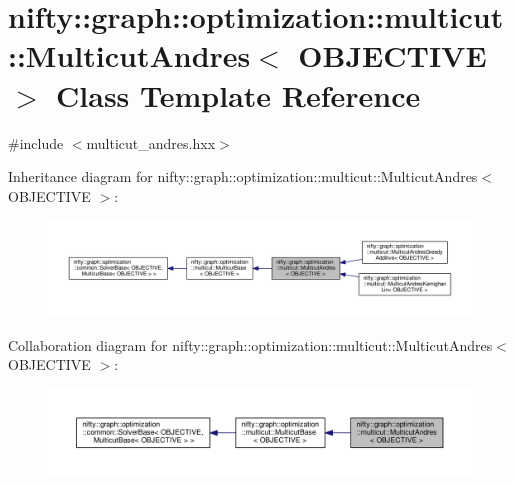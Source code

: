 \hypertarget{classnifty_1_1graph_1_1optimization_1_1multicut_1_1MulticutAndres}{}\section{nifty\+:\+:graph\+:\+:optimization\+:\+:multicut\+:\+:Multicut\+Andres$<$ O\+B\+J\+E\+C\+T\+I\+V\+E $>$ Class Template Reference}
\label{classnifty_1_1graph_1_1optimization_1_1multicut_1_1MulticutAndres}


{\ttfamily \#include $<$multicut\+\_\+andres.\+hxx$>$}



Inheritance diagram for nifty\+:\+:graph\+:\+:optimization\+:\+:multicut\+:\+:Multicut\+Andres$<$ O\+B\+J\+E\+C\+T\+I\+V\+E $>$\+:\nopagebreak
\begin{figure}[H]
\begin{center}
\leavevmode
\includegraphics[width=350pt]{classnifty_1_1graph_1_1optimization_1_1multicut_1_1MulticutAndres__inherit__graph}
\end{center}
\end{figure}


Collaboration diagram for nifty\+:\+:graph\+:\+:optimization\+:\+:multicut\+:\+:Multicut\+Andres$<$ O\+B\+J\+E\+C\+T\+I\+V\+E $>$\+:\nopagebreak
\begin{figure}[H]
\begin{center}
\leavevmode
\includegraphics[width=350pt]{classnifty_1_1graph_1_1optimization_1_1multicut_1_1MulticutAndres__coll__graph}
\end{center}
\end{figure}
